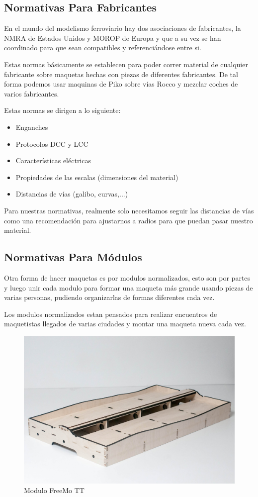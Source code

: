 \subsection{Normativas Para Fabricantes}
En el mundo del modelismo ferroviario hay dos asociaciones de fabricantes, la NMRA de Estados Unidos y MOROP de Europa y que a su vez se han coordinado para que sean compatibles y referenciándose entre si.

Estas normas básicamente se establecen para poder correr material de cualquier fabricante sobre maquetas hechas con piezas de diferentes fabricantes. De tal forma podemos usar maquinas de Piko sobre vías Rocco y mezclar coches de varios fabricantes.

Estas normas se dirigen a lo siguiente:
\begin{itemize}
	\item Enganches
	\item Protocolos DCC y LCC
	\item Características eléctricas
	\item Propiedades de las escalas (dimensiones del material)
	\item Distancias de vías (galibo, curvas,...)
\end{itemize}
Para nuestras normativas, realmente solo necesitamos seguir las distancias de vías como una recomendación para ajustarnos a radios para que puedan pasar nuestro material.
\subsection{Normativas Para Módulos}
Otra forma de hacer maquetas es por modulos normalizados, esto son por partes y luego unir cada modulo para formar una maqueta más grande usando piezas de varias personas, pudiendo organizarlas de formas diferentes cada vez.

Los modulos normalizados estan pensados para realizar encuentros de maquetistas llegados de varias ciudades y montar una maqueta nueva cada vez.

\begin{figure}[h]
	\centering\includegraphics[scale=0.10]{chapters/0X_Normativas_01_Intro/IMG_0017.JPG}
	\caption{Modulo FreeMo TT}
	\label{fig:modulott}
\end{figure}


